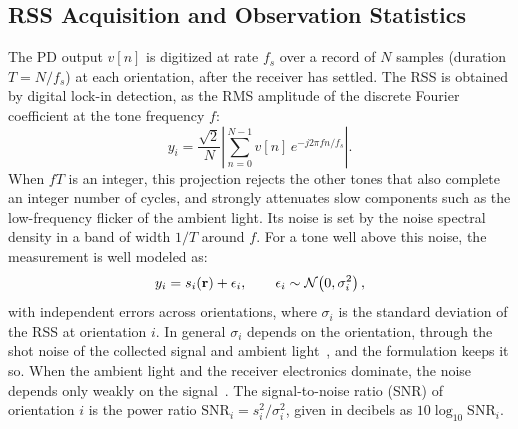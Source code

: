 \subsection{RSS Acquisition and Observation Statistics}
\label{subsec:observations}
The PD output $v[n]$ is digitized at rate $f_s$ over a record of $N$ samples (duration $T=N/f_s$) at each orientation, after the receiver has settled. The RSS is obtained by digital lock-in detection, as the RMS amplitude of the discrete Fourier coefficient at the tone frequency $f$:
\begin{equation}
 y_i=\frac{\sqrt2}{N}\left|\sum_{n=0}^{N-1}v[n]\,e^{-j2\pi fn/f_s}\right|.
 \label{eq:lockin}
\end{equation}
When $fT$ is an integer, this projection rejects the other tones that also complete an integer number of cycles, and strongly attenuates slow components such as the low-frequency flicker of the ambient light. Its noise is set by the noise spectral density in a band of width $1/T$ around $f$. For a tone well above this noise, the measurement is well modeled as:
\begin{equation}
 y_i=s_i(\mathbf{r})+\epsilon_i,\qquad
 \epsilon_i\sim\mathcal N\!\left(0,\sigma_i^2\right),
 \label{eq:observation}
\end{equation}
with independent errors across orientations, where $\sigma_i$ is the standard deviation of the RSS at orientation $i$. In general $\sigma_i$ depends on the orientation, through the shot noise of the collected signal and ambient light~\cite{Komine2004}, and the formulation keeps it so. When the ambient light and the receiver electronics dominate, the noise depends only weakly on the signal~\cite{Kahn1997}. The signal-to-noise ratio (SNR) of orientation $i$ is the power ratio $\mathrm{SNR}_i=s_i^2/\sigma_i^2$, given in decibels as $10\log_{10}\mathrm{SNR}_i$.
